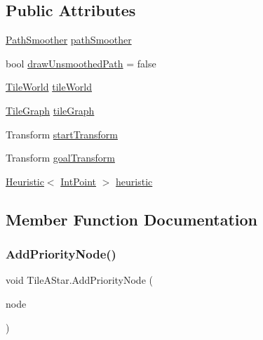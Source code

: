 \subsection*{Public Attributes}
\begin{DoxyCompactItemize}
\item 
\mbox{\hyperlink{class_path_smoother}{Path\+Smoother}} \mbox{\hyperlink{class_tile_a_star_a8be7b45c974dd14d03e25c9b14c68bbb}{path\+Smoother}}
\item 
bool \mbox{\hyperlink{class_tile_a_star_ad703b3c8e7da213a77f48aac7a31a584}{draw\+Unsmoothed\+Path}} = false
\item 
\mbox{\hyperlink{class_tile_world}{Tile\+World}} \mbox{\hyperlink{class_tile_a_star_af591c7bc11527c0fbd3391de4662b5fd}{tile\+World}}
\item 
\mbox{\hyperlink{class_tile_graph}{Tile\+Graph}} \mbox{\hyperlink{class_tile_a_star_ae61928ec47179b3c2eb0970a1fa357f0}{tile\+Graph}}
\item 
Transform \mbox{\hyperlink{class_tile_a_star_ac069531b4fcda54823e312cad7dc48b3}{start\+Transform}}
\item 
Transform \mbox{\hyperlink{class_tile_a_star_aaa0642f5a2f60fb38db368e8681f561d}{goal\+Transform}}
\item 
\mbox{\hyperlink{class_heuristic}{Heuristic}}$<$ \mbox{\hyperlink{struct_int_point}{Int\+Point}} $>$ \mbox{\hyperlink{class_tile_a_star_a002f676fe798cb5dba26e360fac164b9}{heuristic}}
\end{DoxyCompactItemize}


\subsection{Member Function Documentation}
\mbox{\label{class_tile_a_star_a287ce910694b2dbf17b03a136557fc26}} 
\subsubsection{\texorpdfstring{Add\+Priority\+Node()}{AddPriorityNode()}}
{\footnotesize\ttfamily void Tile\+A\+Star.\+Add\+Priority\+Node (\begin{DoxyParamCaption}\item[{\mbox{\hyperlink{struct_int_point}{Int\+Point}}}]{node }\end{DoxyParamCaption})}

